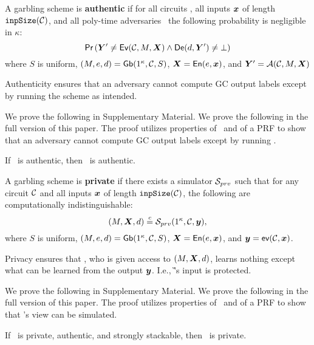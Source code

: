 \begin{definition}[Authenticity]\label{def:authenticity}
  A garbling scheme is \textbf{authentic} if for
  all circuits \cir,
  all inputs $\cirinp$ of length $\mathtt{inpSize}(\mathcal C)$,
  and all poly-time adversaries \adv\
  the following probability is negligible in $\kappa$:
  \[
    \pr{\gcirout' \neq \gEv(\cir, \mat,\gcirinp)
    \land
    \gDe(d, \gcirout') \neq \bot}
  \]
  where
  $S$ is uniform,
  $(M, e, d) = \textsf{Gb}(1^\kappa,\mathcal C,S)$,
  $\gcirinp = \gEn(e,\cirinp)$,
  and $\gcirout' = \adv(\cir, \mat, \gcirinp)$
\end{definition}

Authenticity ensures that an adversary cannot compute GC output labels
except by running the scheme as intended.

\iffull
We prove the following in Supplementary Material.
\else
We prove the following in the full version of this paper.
\fi
The proof
utilizes properties of \underscheme\ and of a PRF to show
that an adversary cannot compute GC output labels except by running
\ourschemelong.

\begin{theorem}\label{thm:authenticity}
  If \underscheme\ is authentic, then \ourschemelong\ is authentic.
\end{theorem}

\begin{definition}[Privacy]\label{def:privacy}
  A garbling scheme is \textbf{private} if
  there exists a simulator $\mathcal{S}_{prv}$ such that for
  any circuit $\mathcal C$
  and all inputs $\cirinp$ of length $\mathtt{inpSize}(\mathcal C)$,
  the following are computationally indistinguishable:
   \[
  (\mat, \gcirinp, d)
  \indist
  \simulator_{prv}(1^\kappa, \cir, \cirout),
  \]
  where
  $S$ is uniform,
   $(M, e, d) = \textsf{Gb}(1^\kappa,\mathcal C,S)$,
  $\gcirinp = \gEn(e,\cirinp)$,
  and $\cirout = \gev(\cir,\cirinp)$.
\end{definition}


Privacy ensures that \E, who is given access to
$(\mat, \gcirinp, d)$, learns nothing except what can be learned from the output
$\cirout$. I.e., \G's input is protected.

\iffull
We prove the following in Supplementary Material.
\else
We prove the following in the full version of this paper.
\fi
The proof
utilizes properties of \underscheme\ and of a PRF to show
that \E's view can be simulated.

\begin{theorem}\label{thm:privacy}
  If \underscheme\ is private, authentic, and strongly stackable, then
  \ourschemelong\ is private.
\end{theorem}
